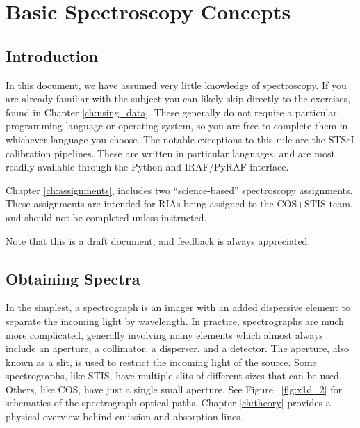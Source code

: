 \chapter{Basic Spectroscopy Concepts}
\label{ch:intro}

\section{Introduction}
In this document, we have assumed very little knowledge of spectroscopy. If you are already familiar with the subject you can likely skip directly to the exercises, found in Chapter \ref{ch:using_data}. These generally do not require a particular programming language or operating system, so you are free to complete them in whichever language you choose.  The notable exceptions to this rule are the STScI calibration pipelines.  These are written in particular languages, and are most readily available through the Python and IRAF/PyRAF interface.  

Chapter \ref{ch:assignments}, includes two ``science-based'' spectroscopy assignments. These assignments are intended for RIAs being assigned to the COS+STIS team, and should not be completed unless instructed.

Note that this is a draft document, and feedback is always appreciated.

\section{Obtaining Spectra}
In the simplest, a spectrograph is an imager with an added dispersive element to separate the incoming light by wavelength.  In practice, spectrographs are much more complicated, generally involving many elements which almost always include an aperture, a collimator, a disperser, and a detector.  The aperture, also known as a slit, is used to restrict the incoming light of the source.  Some spectrographs, like STIS, have multiple slits of different sizes that can be used.  Others, like COS, have just a single small aperture. See Figure ~\ref{fig:x1d_2} for schematics of the spectrograph optical paths. Chapter \ref{ch:theory} provides a physical overview behind emission and absorption lines. 

